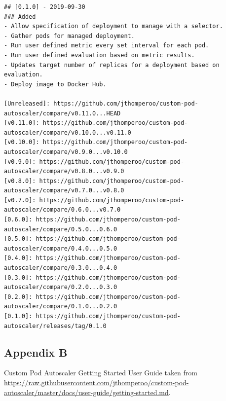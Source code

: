 \begin{lstlisting}
## [0.1.0] - 2019-09-30
### Added
- Allow specification of deployment to manage with a selector.
- Gather pods for managed deployment.
- Run user defined metric every set interval for each pod.
- Run user defined evaluation based on metric results.
- Updates target number of replicas for a deployment based on evaluation.
- Deploy image to Docker Hub.

[Unreleased]: https://github.com/jthomperoo/custom-pod-autoscaler/compare/v0.11.0...HEAD
[v0.11.0]: https://github.com/jthomperoo/custom-pod-autoscaler/compare/v0.10.0...v0.11.0
[v0.10.0]: https://github.com/jthomperoo/custom-pod-autoscaler/compare/v0.9.0...v0.10.0
[v0.9.0]: https://github.com/jthomperoo/custom-pod-autoscaler/compare/v0.8.0...v0.9.0
[v0.8.0]: https://github.com/jthomperoo/custom-pod-autoscaler/compare/v0.7.0...v0.8.0
[v0.7.0]: https://github.com/jthomperoo/custom-pod-autoscaler/compare/0.6.0...v0.7.0
[0.6.0]: https://github.com/jthomperoo/custom-pod-autoscaler/compare/0.5.0...0.6.0
[0.5.0]: https://github.com/jthomperoo/custom-pod-autoscaler/compare/0.4.0...0.5.0
[0.4.0]: https://github.com/jthomperoo/custom-pod-autoscaler/compare/0.3.0...0.4.0
[0.3.0]: https://github.com/jthomperoo/custom-pod-autoscaler/compare/0.2.0...0.3.0
[0.2.0]: https://github.com/jthomperoo/custom-pod-autoscaler/compare/0.1.0...0.2.0
[0.1.0]: https://github.com/jthomperoo/custom-pod-autoscaler/releases/tag/0.1.0
\end{lstlisting}

\subsection{Appendix B}

Custom Pod Autoscaler Getting Started User Guide taken from
\url{https://raw.githubusercontent.com/jthomperoo/custom-pod-autoscaler/master/docs/user-guide/getting-started.md}.

